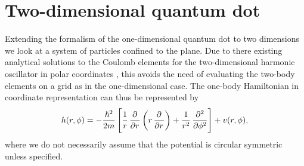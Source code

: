 \section{Two-dimensional quantum dot}
    Extending the formalism of the one-dimensional quantum dot to two dimensions
    we look at a system of particles confined to the plane.
    Due to there existing analytical solutions to the Coulomb elements for the
    two-dimensional harmonic oscillator in polar coordinates
    \cite{anisimovas1998energy}, this avoids the need of evaluating the two-body
    elements on a grid as in the one-dimensional case.
    The one-body Hamiltonian in coordinate representation can thus be
    represented by
    \begin{align}
        \oneten(r, \phi)
        = -\frac{\hslash^2}{2m}\brak{
            \frac{1}{r}\dpd{}{r}\para{
                r\dpd{}{r}
            }
            + \frac{1}{r^2}\dpd[2]{}{\phi}
        }
        + v(r, \phi),
    \end{align}
    where we do not necessarily assume that the potential is circular symmetric
    unless specified.

